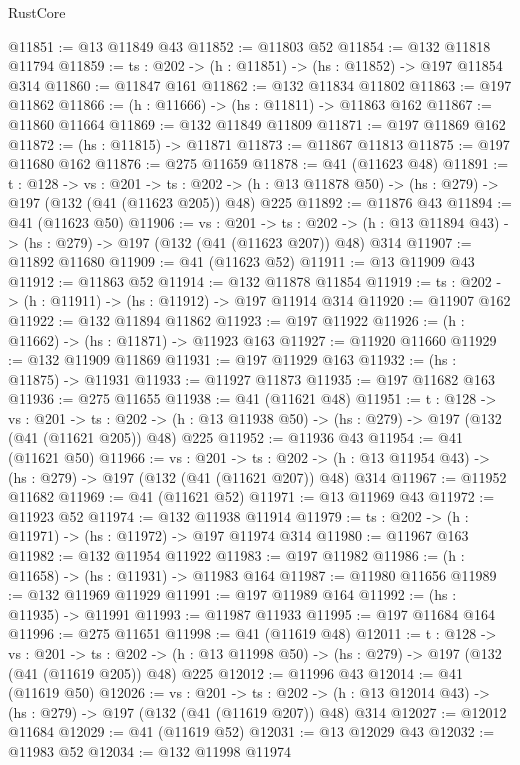 \begin{lexlean}{RustCore}
\begin{coremodule}
@11851 := @13 @11849 @43
@11852 := @11803 @52
@11854 := @132 @11818 @11794
@11859 := {ts : @202} -> (h : @11851) -> (hs : @11852) -> @197 @11854 @314
@11860 := @11847 @161
@11862 := @132 @11834 @11802
@11863 := @197 @11862
@11866 := (h : @11666) -> (hs : @11811) -> @11863 @162
@11867 := @11860 @11664
@11869 := @132 @11849 @11809
@11871 := @197 @11869 @162
@11872 := (hs : @11815) -> @11871
@11873 := @11867 @11813
@11875 := @197 @11680 @162
@11876 := @275 @11659
@11878 := @41 (@11623 @48)
@11891 := {t : @128} ->
  {vs : @201} ->
  {ts : @202} -> (h : @13 @11878 @50) -> (hs : @279) -> @197 (@132 (@41 (@11623 @205)) @48) @225
@11892 := @11876 @43
@11894 := @41 (@11623 @50)
@11906 := {vs : @201} ->
  {ts : @202} -> (h : @13 @11894 @43) -> (hs : @279) -> @197 (@132 (@41 (@11623 @207)) @48) @314
@11907 := @11892 @11680
@11909 := @41 (@11623 @52)
@11911 := @13 @11909 @43
@11912 := @11863 @52
@11914 := @132 @11878 @11854
@11919 := {ts : @202} -> (h : @11911) -> (hs : @11912) -> @197 @11914 @314
@11920 := @11907 @162
@11922 := @132 @11894 @11862
@11923 := @197 @11922
@11926 := (h : @11662) -> (hs : @11871) -> @11923 @163
@11927 := @11920 @11660
@11929 := @132 @11909 @11869
@11931 := @197 @11929 @163
@11932 := (hs : @11875) -> @11931
@11933 := @11927 @11873
@11935 := @197 @11682 @163
@11936 := @275 @11655
@11938 := @41 (@11621 @48)
@11951 := {t : @128} ->
  {vs : @201} ->
  {ts : @202} -> (h : @13 @11938 @50) -> (hs : @279) -> @197 (@132 (@41 (@11621 @205)) @48) @225
@11952 := @11936 @43
@11954 := @41 (@11621 @50)
@11966 := {vs : @201} ->
  {ts : @202} -> (h : @13 @11954 @43) -> (hs : @279) -> @197 (@132 (@41 (@11621 @207)) @48) @314
@11967 := @11952 @11682
@11969 := @41 (@11621 @52)
@11971 := @13 @11969 @43
@11972 := @11923 @52
@11974 := @132 @11938 @11914
@11979 := {ts : @202} -> (h : @11971) -> (hs : @11972) -> @197 @11974 @314
@11980 := @11967 @163
@11982 := @132 @11954 @11922
@11983 := @197 @11982
@11986 := (h : @11658) -> (hs : @11931) -> @11983 @164
@11987 := @11980 @11656
@11989 := @132 @11969 @11929
@11991 := @197 @11989 @164
@11992 := (hs : @11935) -> @11991
@11993 := @11987 @11933
@11995 := @197 @11684 @164
@11996 := @275 @11651
@11998 := @41 (@11619 @48)
@12011 := {t : @128} ->
  {vs : @201} ->
  {ts : @202} -> (h : @13 @11998 @50) -> (hs : @279) -> @197 (@132 (@41 (@11619 @205)) @48) @225
@12012 := @11996 @43
@12014 := @41 (@11619 @50)
@12026 := {vs : @201} ->
  {ts : @202} -> (h : @13 @12014 @43) -> (hs : @279) -> @197 (@132 (@41 (@11619 @207)) @48) @314
@12027 := @12012 @11684
@12029 := @41 (@11619 @52)
@12031 := @13 @12029 @43
@12032 := @11983 @52
@12034 := @132 @11998 @11974

\end{coremodule}
\end{lexlean}
